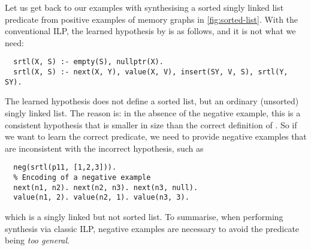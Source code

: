 Let us get back to our examples with synthesising a sorted singly
linked list predicate from positive examples of memory graphs in
\autoref{fig:sorted-list}. 
%
With the conventional ILP, the learned hypothesis by \popper is as
follows, and it is not what we need:
%
\begin{verbatim}
  srtl(X, S) :- empty(S), nullptr(X).
  srtl(X, S) :- next(X, Y), value(X, V), insert(SY, V, S), srtl(Y, SY).
\end{verbatim}
%
The learned hypothesis does not define a sorted list,
but an ordinary (unsorted) singly linked list.
%
The reason is: in the absence of the negative example, this is a
consistent hypothesis that is smaller in size than the correct
definition of .
So if we want to learn the correct predicate, we need to provide negative examples that are inconsistent with the incorrect hypothesis, such as
%
\begin{verbatim}
  neg(srtl(p11, [1,2,3])).
  % Encoding of a negative example
  next(n1, n2). next(n2, n3). next(n3, null). 
  value(n1, 2). value(n2, 1). value(n3, 3).
\end{verbatim}
%
which is a singly linked but not sorted list. To summarise, when
performing synthesis via classic ILP, negative examples are necessary
to avoid the predicate being \emph{too general}.
%



